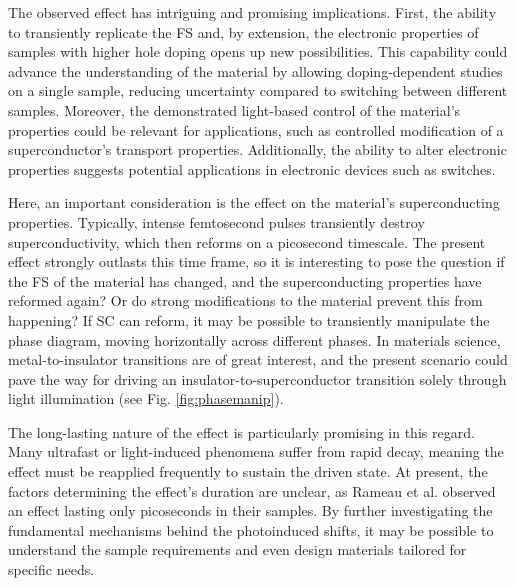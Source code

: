 The observed effect has intriguing and promising implications.
First, the ability to transiently replicate the FS and, by extension, the electronic properties of samples with higher hole doping opens up new possibilities.
This capability could advance the understanding of the material by allowing doping-dependent studies on a single sample, reducing uncertainty compared to switching between different samples.
Moreover, the demonstrated light-based control of the material's properties could be relevant for applications, such as controlled modification of a superconductor’s transport properties.
Additionally, the ability to alter electronic properties suggests potential applications in electronic devices such as switches.

Here, an important consideration is the effect on the material’s superconducting properties.
Typically, intense femtosecond pulses transiently destroy superconductivity, which then reforms on a picosecond timescale.
The present effect strongly outlasts this time frame, so it is interesting to pose the question if the FS of the material has changed, and the superconducting properties have reformed again?
Or do strong modifications to the material prevent this from happening?
If SC can reform, it may be possible to transiently manipulate the phase diagram, moving horizontally across different phases.
In materials science, metal-to-insulator transitions are of great interest, and the present scenario could pave the way for driving an insulator-to-superconductor transition solely through light illumination (see Fig. \ref{fig:phasemanip}).

The long-lasting nature of the effect is particularly promising in this regard.
Many ultrafast or light-induced phenomena suffer from rapid decay, meaning the effect must be reapplied frequently to sustain the driven state.
At present, the factors determining the effect’s duration are unclear, as Rameau et al. \cite{rameau_photoinduced_2014} observed an effect lasting only picoseconds in their samples.
By further investigating the fundamental mechanisms behind the photoinduced shifts, it may be possible to understand the sample requirements and even design materials tailored for specific needs.